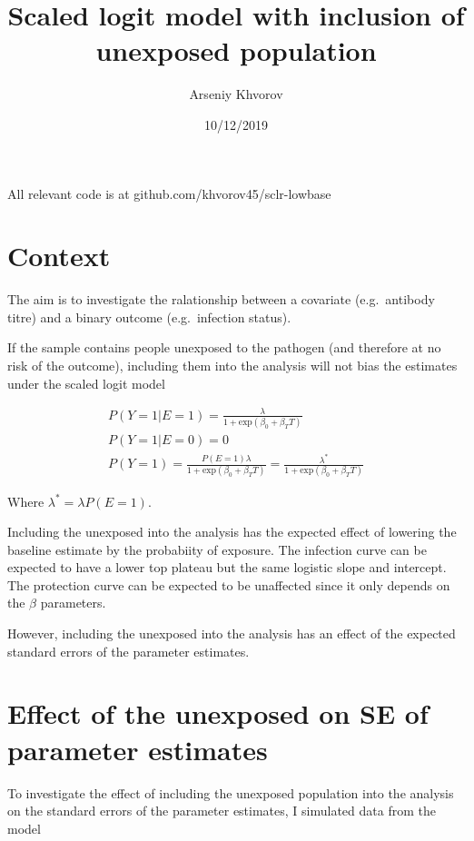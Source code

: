 \documentclass[
]{article}
\title{Scaled logit model with inclusion of unexposed population}
\author{Arseniy Khvorov}
\date{10/12/2019}
\begin{document}
\maketitle

All relevant code is at github.com/khvorov45/sclr-lowbase

\hypertarget{context}{%
\section{Context}\label{context}}

The aim is to investigate the ralationship between a covariate (e.g.~antibody titre) and a binary outcome (e.g.~infection status).

If the sample contains people unexposed to the pathogen (and therefore at no risk of the outcome), including them into the analysis will not bias the estimates under the scaled logit model

\[
\begin{gathered}
P(Y=1|E=1) = \frac{\lambda}{1+\text{exp}(\beta_0+\beta_T T)} \\
P(Y=1|E=0) = 0 \\
P(Y=1) = \frac{P(E=1)\lambda}{1+\text{exp}(\beta_0+\beta_T T)} = \frac{\lambda^*}{1+\text{exp}(\beta_0+\beta_T T)}
\end{gathered}
\]

Where \(\lambda^* = \lambda P(E=1)\).

Including the unexposed into the analysis has the expected effect of lowering the baseline estimate by the probabiity of exposure. The infection curve can be expected to have a lower top plateau but the same logistic slope and intercept. The protection curve can be expected to be unaffected since it only depends on the \(\beta\) parameters.

However, including the unexposed into the analysis has an effect of the expected standard errors of the parameter estimates.

\hypertarget{effect-of-the-unexposed-on-se-of-parameter-estimates}{%
\section{Effect of the unexposed on SE of parameter estimates}\label{effect-of-the-unexposed-on-se-of-parameter-estimates}}

To investigate the effect of including the unexposed population into the analysis on the standard errors of the parameter estimates, I simulated data from the model
\end{document}
